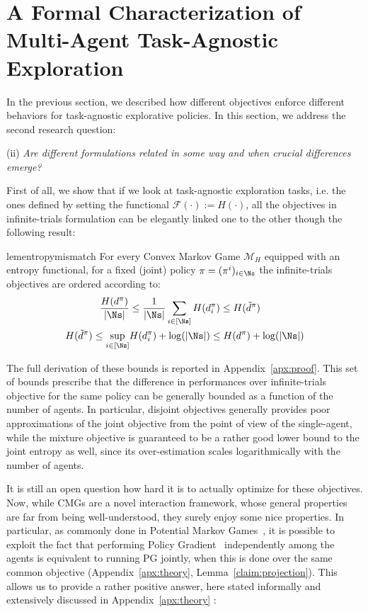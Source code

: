 \section{A Formal Characterization of Multi-Agent Task-Agnostic Exploration}
\label{sec:properties}

In the previous section, we described how different objectives enforce different behaviors for task-agnostic explorative policies. In this section, we address the second research question:
\begin{center}
    (ii) \emph{Are different formulations related
in some way and when crucial differences emerge?}
\end{center}

First of all, we show that if we look at task-agnostic exploration tasks, i.e. the ones defined by setting the functional $\mathcal F(\cdot) := H(\cdot)$, all the objectives in infinite-trials formulation can be elegantly linked one to the other though the following result:

\begin{restatable}{lem}{entropymismatch}
    \label{lem:entropymismatch} 
    For every Convex Markov Game $\mathcal M_{H}$ equipped with an entropy functional, for a fixed (joint) policy $\pi = (\pi^{i})_{i \in \Ns}$ the infinite-trials objectives are ordered according to:
    \begin{align*}
        \frac{H(d^\pi)}{|\Ns|} &\leq \frac{1}{|\Ns|}\sum_{i \in [\Ns]}H(d_i^\pi)  \leq H(\tilde d^\pi)  \\
        H(\tilde d^\pi) \leq \sup_{i \in [\Ns]}&H(d_i^\pi) + \log(|\Ns|) \leq  H(d^\pi) + \log(|\Ns|)
    \end{align*}
\end{restatable}
The full derivation of these bounds is reported in Appendix~\ref{apx:proof}. This set of bounds prescribe that the difference in performances over infinite-trials objective for the same policy can be generally bounded as a function of the number of agents. In particular, disjoint objectives generally provides poor approximations of the joint objective from the point of view of the single-agent, while the mixture objective is guaranteed to be a rather good lower bound to the joint entropy as well, since its over-estimation scales logarithmically with the number of agents.

It is still an open question how hard it is to actually optimize for these objectives. Now, while CMGs are a novel interaction framework, whose general properties are far from being well-understood, they surely enjoy some nice properties. In particular, as commonly done in Potential Markov Games~\citep{leonardos2021globalconvergencemultiagentpolicy}, it is possible to exploit the fact that performing Policy Gradient~\citep[PG,][]{sutton1999policy, peters2008reinforcement} independently among the agents is equivalent to running PG jointly, when this is done over the same common objective (Appendix~\ref{apx:theory}, Lemma~\ref{claim:projection}). This allows us to provide a rather positive answer, here stated informally and extensively discussed in Appendix~\ref{apx:theory} :

